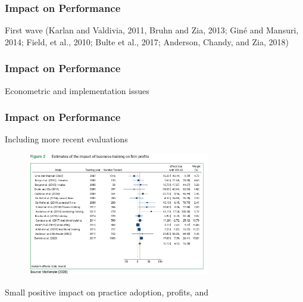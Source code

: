 \documentclass[hideothersubsections, usenames,dvipsnames,11pt]{beamer}
\newenvironment{itemize_2pt}{\itemize\addtolength{\itemsep}{2pt}}{\enditemize}
\begin{document}

\begin{frame}
\frametitle{Impact on Performance}
	\begin{itemize_2pt}
	\item First wave (Karlan and Valdivia, 2011, Bruhn and Zia, 2013; Giné and Mansuri, 2014; Field, et al., 2010; Bulte et al., 2017; Anderson, Chandy, and Zia, 2018)
					 \citep{Karlan2011} \citep{Field2010} \citet{Gine2014} \citep{Bruhn2013} \citep{Bulte2017} \citep{Anderson2018}
	\vspace{0.1in}
	\end{itemize_2pt}
\end{frame}

\begin{frame}
\frametitle{Impact on Performance}
	\begin{itemize_2pt}
	\item Econometric and implementation issues \citep{McKenzie2014}
	\vspace{0.1in}
	\end{itemize_2pt}
\end{frame}

\begin{frame}[label=McK2020_profits]
\frametitle{Impact on Performance}
	
	Including more recent evaluations \citep[see,][]{McKenzie2020}
	
\vspace{-0.5em}	
	
	\begin{figure}[htbp]
		\centering
		\includegraphics[width=21.5em]{pics/McK2020_profits.png}
		\label{McKenzie(2020): Profits}
	\end{figure}	
	
	\vspace{-1em}	
	
	\begin{itemize_2pt}
		\item Small positive impact on practice adoption, profits, and \hyperlink{McK2020_sales}{\beamergotobutton{sales}}
	\end{itemize_2pt}
	
	
\end{frame}
\end{document}
